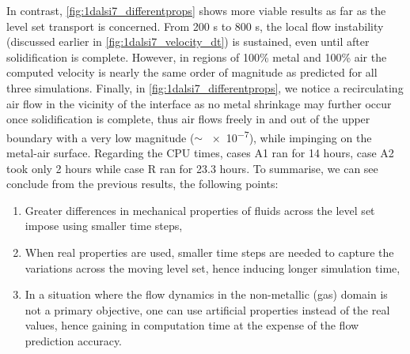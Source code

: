 In contrast, \cref{fig:1dalsi7_differentprops} shows more viable results as far as the level set transport is concerned.
From 200 s to 800 s, the local flow instability (discussed earlier in \cref{fig:1dalsi7_velocity_dt}) is sustained, even until after solidification is complete.
However, in regions of 100\% metal and 100\% air the computed velocity is nearly the same order of magnitude as predicted for all three simulations.
Finally, in \cref{fig:1dalsi7_differentprops}, we notice a recirculating air flow in the vicinity of the interface as no metal shrinkage 
may further occur once solidification is complete, thus air flows freely in and out 
of the upper boundary with a very low magnitude ($\sim$ \SI{e-7}{\uvelocity}), while impinging on the metal-air surface.
Regarding the CPU times, cases A1 ran for 14 hours, case A2 took only 2 hours while case R ran for 23.3 hours.
To summarise, we can see conclude from the previous results, the following points:
\begin{enumerate}
	\itemsep0em 
	\item Greater differences in mechanical properties of fluids across the level set impose using smaller time steps,
	\item When real properties are used, smaller time steps are needed to capture the variations across the moving level set, hence inducing longer simulation time,
	\item In a situation where the flow dynamics in the non-metallic (gas) domain is not a primary objective, one can 
		   use artificial properties instead of the real values, hence gaining in computation time at the expense of the flow prediction accuracy.
\end{enumerate}  
